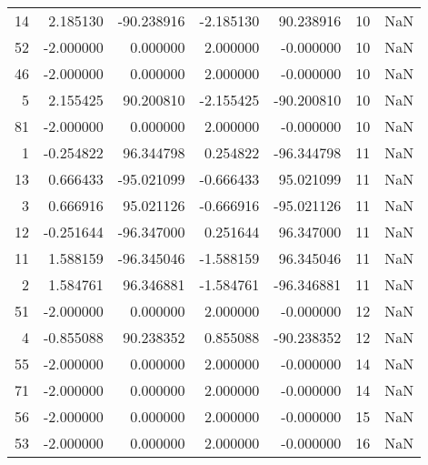 \begin{tabular}{rrrrrrr}
14 &  2.185130 & -90.238916 & -2.185130 &   90.238916 &          10 & NaN \\
52 & -2.000000 &   0.000000 &  2.000000 &   -0.000000 &          10 & NaN \\
46 & -2.000000 &   0.000000 &  2.000000 &   -0.000000 &          10 & NaN \\
 5 &  2.155425 &  90.200810 & -2.155425 &  -90.200810 &          10 & NaN \\
81 & -2.000000 &   0.000000 &  2.000000 &   -0.000000 &          10 & NaN \\
 1 & -0.254822 &  96.344798 &  0.254822 &  -96.344798 &          11 & NaN \\
13 &  0.666433 & -95.021099 & -0.666433 &   95.021099 &          11 & NaN \\
 3 &  0.666916 &  95.021126 & -0.666916 &  -95.021126 &          11 & NaN \\
12 & -0.251644 & -96.347000 &  0.251644 &   96.347000 &          11 & NaN \\
11 &  1.588159 & -96.345046 & -1.588159 &   96.345046 &          11 & NaN \\
 2 &  1.584761 &  96.346881 & -1.584761 &  -96.346881 &          11 & NaN \\
51 & -2.000000 &   0.000000 &  2.000000 &   -0.000000 &          12 & NaN \\
 4 & -0.855088 &  90.238352 &  0.855088 &  -90.238352 &          12 & NaN \\
55 & -2.000000 &   0.000000 &  2.000000 &   -0.000000 &          14 & NaN \\
71 & -2.000000 &   0.000000 &  2.000000 &   -0.000000 &          14 & NaN \\
56 & -2.000000 &   0.000000 &  2.000000 &   -0.000000 &          15 & NaN \\
53 & -2.000000 &   0.000000 &  2.000000 &   -0.000000 &          16 & NaN \\
\bottomrule
\end{tabular}
